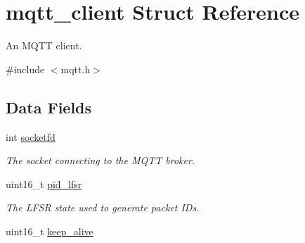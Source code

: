\hypertarget{structmqtt__client}{}\section{mqtt\+\_\+client Struct Reference}
\label{structmqtt__client}


An M\+Q\+TT client.  




{\ttfamily \#include $<$mqtt.\+h$>$}

\subsection*{Data Fields}
\begin{DoxyCompactItemize}
\item 
int \hyperlink{structmqtt__client_a9ba39ec6a412d49792bf5f106754eac1}{socketfd}\hypertarget{structmqtt__client_a9ba39ec6a412d49792bf5f106754eac1}{}\label{structmqtt__client_a9ba39ec6a412d49792bf5f106754eac1}

\begin{DoxyCompactList}\small\item\em The socket connecting to the M\+Q\+TT broker. \end{DoxyCompactList}\item 
uint16\+\_\+t \hyperlink{structmqtt__client_a8b11e2b1612858ecd6656d694154698f}{pid\+\_\+lfsr}\hypertarget{structmqtt__client_a8b11e2b1612858ecd6656d694154698f}{}\label{structmqtt__client_a8b11e2b1612858ecd6656d694154698f}

\begin{DoxyCompactList}\small\item\em The L\+F\+SR state used to generate packet ID\textquotesingle{}s. \end{DoxyCompactList}\item 
uint16\+\_\+t \hyperlink{structmqtt__client_aff533344a060e58277698039f547147a}{keep\+\_\+alive}\hypertarget{structmqtt__client_aff533344a060e58277698039f547147a}{}\label{structmqtt__client_aff533344a060e58277698039f547147a}


\end{DoxyCompactItemize}
